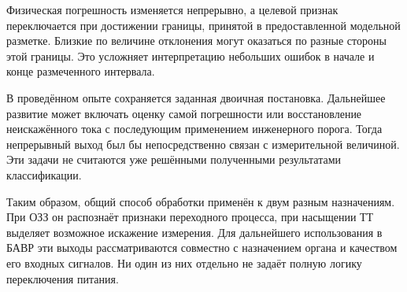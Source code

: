 Физическая погрешность изменяется непрерывно,
а целевой признак переключается при достижении
границы, принятой в предоставленной модельной разметке.
Близкие по величине отклонения могут оказаться
по разные стороны этой границы.
Это усложняет интерпретацию небольших ошибок
в начале и конце размеченного интервала.

В проведённом опыте сохраняется заданная
двоичная постановка. Дальнейшее развитие
может включать оценку самой погрешности
или восстановление неискажённого тока
с последующим применением инженерного порога.
Тогда непрерывный выход был бы непосредственно
связан с измерительной величиной.
Эти задачи не считаются уже решёнными
полученными результатами классификации.

Таким образом, общий способ обработки применён
к двум разным назначениям.
При ОЗЗ он распознаёт признаки переходного процесса,
при насыщении ТТ выделяет возможное искажение измерения.
Для дальнейшего использования в БАВР
эти выходы рассматриваются совместно
с назначением органа и качеством его входных сигналов.
Ни один из них отдельно не задаёт полную
логику переключения питания.

